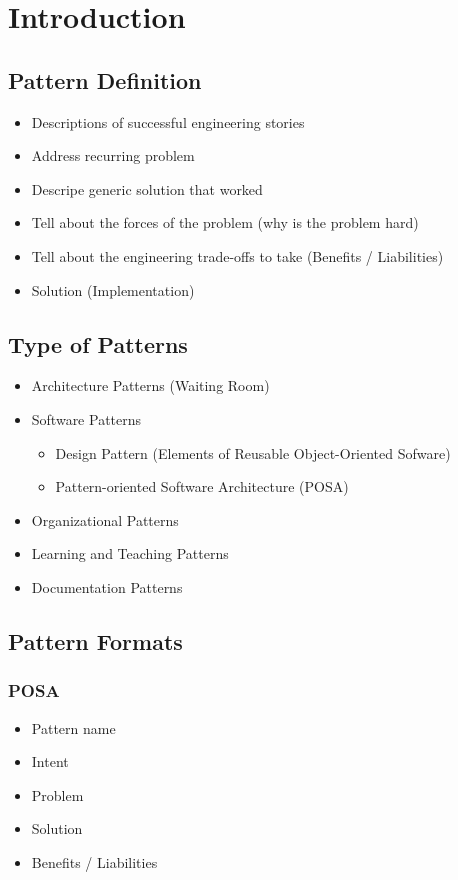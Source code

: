 
\section{Introduction}
\subsection{Pattern Definition}
\begin{itemize}
    \item Descriptions of successful engineering stories
    \item Address recurring problem
    \item Descripe generic solution that worked
    \item Tell about the forces of the problem (why is the problem hard)
    \item Tell about the engineering trade-offs  to take (Benefits / Liabilities)
    \item Solution (Implementation)
\end{itemize}

\subsection{Type of Patterns}
\begin{itemize}
    \item Architecture Patterns (Waiting Room)
    \item Software Patterns
    \begin{itemize}
        \item Design Pattern (Elements of Reusable Object-Oriented Sofware)
        \item Pattern-oriented Software Architecture (POSA)
    \end{itemize}
    \item Organizational Patterns
    \item Learning and Teaching Patterns
    \item Documentation Patterns
\end{itemize}

\subsection{Pattern Formats}
\subsubsection{POSA}
\begin{itemize}
    \item Pattern name
    \item Intent
    \item Problem
    \item Solution
    \item Benefits / Liabilities
\end{itemize}
